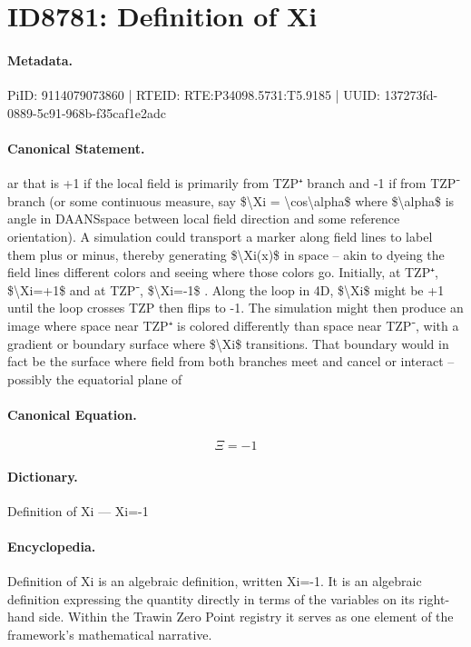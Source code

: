 \section*{ID8781: Definition of Xi}
\paragraph{Metadata.}
PiID: 9114079073860 | RTEID: RTE:P34098.5731:T5.9185 | UUID: 137273fd-0889-5c91-968b-f35caf1e2adc

\paragraph{Canonical Statement.}
ar that is +1 if the local field is primarily from TZP⁺ branch and -1 if from TZP⁻ branch (or some continuous measure, say \$\textbackslash{}Xi = \textbackslash{}cos\textbackslash{}alpha\$ where \$\textbackslash{}alpha\$ is angle in DAANSspace between local field direction and some reference orientation). A simulation could transport a marker along field lines to label them plus or minus, thereby generating \$\textbackslash{}Xi(x)\$ in space – akin to dyeing the field lines different colors and seeing where those colors go. Initially, at TZP⁺, \$\textbackslash{}Xi=+1\$ and at TZP⁻, \$\textbackslash{}Xi=-1\$ . Along the loop in 4D, \$\textbackslash{}Xi\$ might be +1 until the loop crosses TZP then flips to -1. The simulation might then produce an image where space near TZP⁺ is colored differently than space near TZP⁻, with a gradient or boundary surface where \$\textbackslash{}Xi\$ transitions. That boundary would in fact be the surface where field from both branches meet and cancel or interact – possibly the equatorial plane of

\paragraph{Canonical Equation.}
\[
\Xi=-1
\]

\paragraph{Dictionary.}
Definition of Xi — Xi=-1

\paragraph{Encyclopedia.}
Definition of Xi is an algebraic definition, written Xi=-1. It is an algebraic definition expressing the quantity directly in terms of the variables on its right-hand side. Within the Trawin Zero Point registry it serves as one element of the framework's mathematical narrative.
